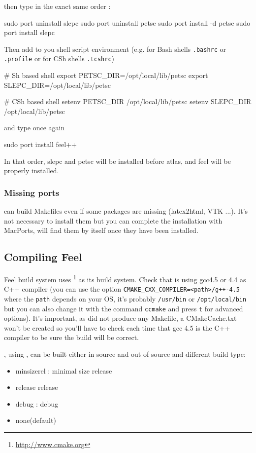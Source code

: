 then type in the exact same order :
\begin{unixcom}
		sudo port uninstall slepc
		sudo port uninstall petsc
		sudo port install -d petsc
		sudo port install slepc
\end{unixcom}
Then add to you shell script environment (e.g. for Bash shells \lstinline|.bashrc| or
\lstinline|.profile| or for CSh shells \lstinline|.tcshrc|)
\begin{unixcom}
  # Sh based shell
  export PETSC_DIR=/opt/local/lib/petsc
  export SLEPC_DIR=/opt/local/lib/petsc

  # CSh based shell
  setenv PETSC_DIR /opt/local/lib/petsc
  setenv SLEPC_DIR /opt/local/lib/petsc
\end{unixcom}
and type once again
\begin{unixcom}
		sudo port install feel++
\end{unixcom}

\noindent In that order, slepc and petsc will be installed before atlas, and feel will be properly installed.

\subsubsection{Missing ports}
\cmake can build Makefiles even if some packages are missing (latex2html, VTK
...). It's not necessary to install them but you can complete the installation
with MacPorts, \cmake will find them by itself once they have been installed.

\subsection{Compiling Feel}
\label{compilingfeel}
Feel build system uses \cmake{}\footnote{\url{http://www.cmake.org}}
as its build system. Check that \cmake is using gcc4.5 or 4.4 as C++ compiler
(you can use the option \lstinline|CMAKE_CXX_COMPILER=<path>/g++-4.5| where the
\lstinline|path| depends on your OS, it's probably \lstinline|/usr/bin| or
\lstinline|/opt/local/bin| but you can also change it with the command \lstinline|ccmake|
and press \lstinline|t| for advanced options).  It's important, as \cmake did
not produce any Makefile, a CMakeCache.txt won't be created so you'll have to
check each time that gcc 4.5 is the C++ compiler to be sure the build will be
correct.

\feel, using \cmake, can be built either in source and out of source and different
build type:
\begin{itemize}
\item minsizerel : minimal size release
\item release release
\item debug : debug
\item none(default)
\end{itemize}


